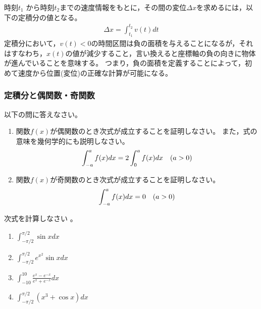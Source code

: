 \documentclass[twocolumn,11pt]{jarticle}
\begin{document}
時刻$t_1$ から時刻$t_2$までの速度情報をもとに，その間の変位$\Delta x$を求めるには，以下の定積分の値となる。
\begin{align*}
  \Delta x=\int_{t_1}^{t_2}v(t)dt
\end{align*}
定積分において，$v(t)<0$の時間区間は負の面積を与えることになるが，それはすなわち，$x(t)$の値が減少すること，言い換えると座標軸の負の向きに物体が進んでいることを意味する。
つまり，負の面積を定義することによって，初めて速度から位置(変位)の正確な計算が可能になる。

\subsubsection{定積分と偶関数・奇関数}
\question 以下の問に答えなさい。
\begin{enumerate}
\item 関数$f(x)$が偶関数のとき次式が成立することを証明しなさい。
  また，式の意味を幾何学的にも説明しなさい。
  \begin{align}
    \int_{-a}^{a}f(x)dx=2\int_{0}^{a}f(x)dx\quad(a>0)\notag
  \end{align}
\item 関数$f(x)$が奇関数のとき次式が成立することを証明しなさい。
  \begin{align}
    \int_{-a}^{a}f(x)dx=0\quad(a>0)\notag
  \end{align}
\end{enumerate}
\nexercise
次式を計算しなさい
。
\begin{enumerate}
\item\label{iitem:int_(-pi/2)^(pi/2)sinxdx}
  $\displaystyle\int_{-\pi/2}^{\pi/2}\sin x dx$
\item\label{iitem:int_(-pi)^(pi)e^(xx)sinxdx}
  $\displaystyle\int_{-\pi/2}^{\pi/2}e^{x^2}\sin x dx$
\item\label{iitem:int_(-10)^(10)tanhxdx}
  $\displaystyle\int_{-10}^{10}\frac{e^x-e^{-x}}{e^x+e^{-x}}dx$
\item\label{iitem:int_(-pi/2)^(pi/2)(x^3+cosx)dx}
  $\displaystyle\int_{-\pi/2}^{\pi/2}(x^3+\cos x)dx$
\end{enumerate}
\end{document}
